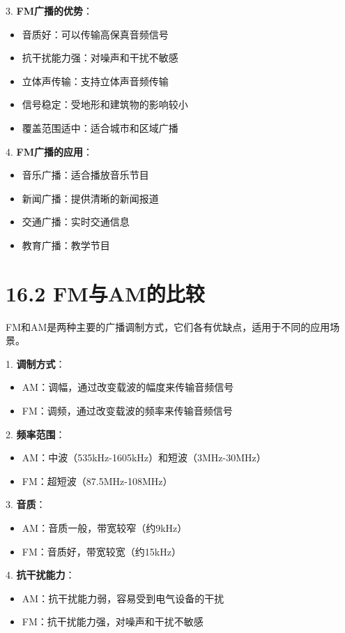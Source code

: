 \documentclass[12pt,UTF8]{ctexbook}
\begin{document}
3. \textbf{FM广播的优势}：
   \begin{itemize}[leftmargin=3.5em]
   \item 音质好：可以传输高保真音频信号
   \item 抗干扰能力强：对噪声和干扰不敏感
   \item 立体声传输：支持立体声音频传输
   \item 信号稳定：受地形和建筑物的影响较小
   \item 覆盖范围适中：适合城市和区域广播
   \end{itemize}

4. \textbf{FM广播的应用}：
   \begin{itemize}[leftmargin=3.5em]
   \item 音乐广播：适合播放音乐节目
   \item 新闻广播：提供清晰的新闻报道
   \item 交通广播：实时交通信息
   \item 教育广播：教学节目
   \end{itemize}

\section*{16.2 FM与AM的比较}

FM和AM是两种主要的广播调制方式，它们各有优缺点，适用于不同的应用场景。

1. \textbf{调制方式}：
   \begin{itemize}[leftmargin=3.5em]
   \item AM：调幅，通过改变载波的幅度来传输音频信号
   \item FM：调频，通过改变载波的频率来传输音频信号
   \end{itemize}

2. \textbf{频率范围}：
   \begin{itemize}[leftmargin=3.5em]
   \item AM：中波（535kHz-1605kHz）和短波（3MHz-30MHz）
   \item FM：超短波（87.5MHz-108MHz）
   \end{itemize}

3. \textbf{音质}：
   \begin{itemize}[leftmargin=3.5em]
   \item AM：音质一般，带宽较窄（约9kHz）
   \item FM：音质好，带宽较宽（约15kHz）
   \end{itemize}

4. \textbf{抗干扰能力}：
   \begin{itemize}[leftmargin=3.5em]
   \item AM：抗干扰能力弱，容易受到电气设备的干扰
   \item FM：抗干扰能力强，对噪声和干扰不敏感
   \end{itemize}
\end{document}
